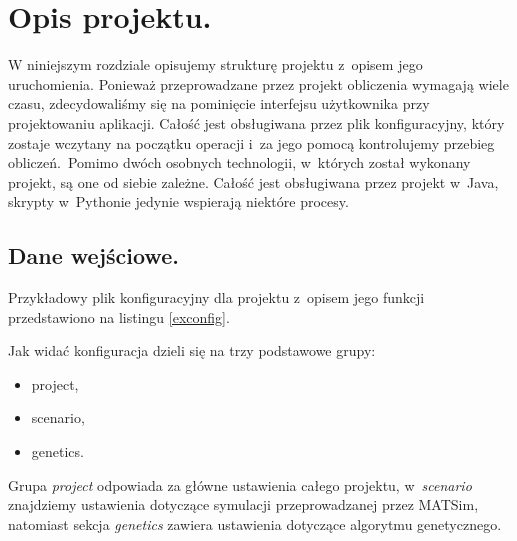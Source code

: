 \documentclass[twoside,12pt]{report}
\let\oldsection\chapter
\def\chapter{\cleardoublepage\oldsection}
\begin{document}


\chapter{Opis projektu.}\label{rozdz.opis} 

W niniejszym rozdziale opisujemy strukturę projektu z~opisem jego uruchomienia. Ponieważ przeprowadzane przez projekt obliczenia wymagają wiele czasu, zdecydowaliśmy się na pominięcie interfejsu użytkownika przy projektowaniu aplikacji. Całość jest obsługiwana przez plik konfiguracyjny, który zostaje wczytany na początku operacji i~za jego pomocą kontrolujemy przebieg obliczeń.~Pomimo dwóch osobnych technologii, w~których został wykonany projekt, są one od siebie zależne. Całość jest obsługiwana przez projekt w~Java, skrypty w~Pythonie jedynie wspierają niektóre procesy.

\section{Dane wejściowe.}

Przykładowy plik konfiguracyjny dla projektu z~opisem jego funkcji przedstawiono na listingu \ref{exconfig}.

 

\vspace*{15px}

Jak widać konfiguracja dzieli się na trzy podstawowe grupy:
\begin{itemize}
\item project,
\item scenario,
\item genetics.
\end{itemize}

\vspace*{15px}

Grupa \textit{project} odpowiada za główne ustawienia całego projektu, w~\textit{scenario} znajdziemy ustawienia dotyczące symulacji przeprowadzanej przez MATSim, natomiast sekcja \textit{genetics} zawiera ustawienia dotyczące algorytmu genetycznego.
\end{document}
